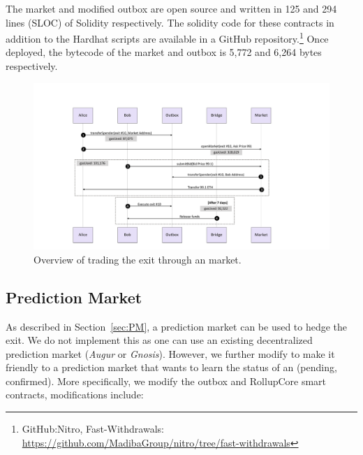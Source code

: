 The market and modified outbox are open source and written in 125 and 294 lines (SLOC) of Solidity respectively. The solidity code for these contracts in addition to the Hardhat scripts are available in a GitHub repository.\footnote{GitHub:Nitro, Fast-Withdrawals: \url{https://github.com/MadibaGroup/nitro/tree/fast-withdrawals}} Once deployed, the bytecode of the market and outbox is 5,772 and 6,264 bytes respectively.

\begin{figure}[t]
	\includegraphics[width=1\textwidth]{figures/marketflow.pdf}
	\caption{Overview of trading the exit through an \layerone market.}
	\centering
	\label{fig:marketflow}
\end{figure}

\subsection{Prediction Market }
As described in Section~\ref{sec:PM}, a prediction market can be used to hedge the exit. We do not implement this as one can use an existing decentralized prediction market (\eg \textit{Augur} or \textit{Gnosis}). However, we further modify \arb \nitro to make it friendly to a prediction market that wants to learn the status of an \rblock (pending, confirmed). More specifically, we modify the \arb \nitro outbox and RollupCore smart contracts, modifications include:

